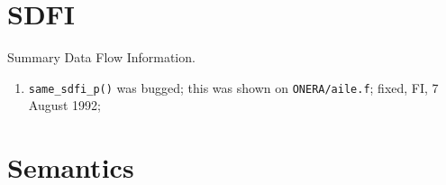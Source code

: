 \section{SDFI}

Summary Data Flow Information.

\begin{enumerate}

  \item \verb+same_sdfi_p()+ was bugged; this was shown on 
        \verb+ONERA/aile.f+; fixed, FI, 7 August 1992;

\end{enumerate}

\section{Semantics}

